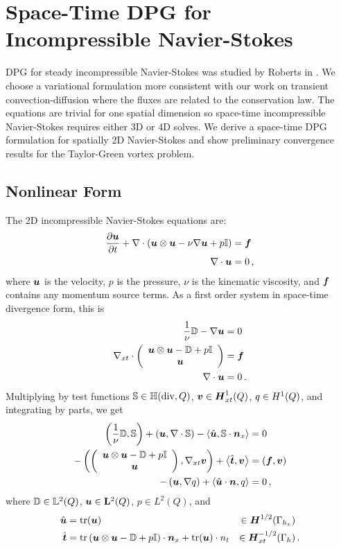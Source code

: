 \documentclass[Dissertation.tex]{subbIles}
\begin{document}
\graphicspath{{../Figures/}}
\chapter{Space-Time DPG for Incompressible Navier-Stokes}
\label{sec:incompressible}

DPG for steady incompressible Navier-Stokes was studied by Roberts in \cite{NateDissertation}. 
We choose a variational formulation more consistent with our work on transient convection-diffusion
where the fluxes are related to the conservation law.
The equations are trivial for one spatial dimension so space-time incompressible
Navier-Stokes requires either 3D or 4D solves.
We derive a space-time DPG formulation for spatially 2D Navier-Stokes and show preliminary 
convergence results for the Taylor-Green vortex problem.

\section{Nonlinear Form}
The 2D incompressible Navier-Stokes equations are:
\begin{align*}
  \frac{\partial\boldsymbol u}{\partial t}+\nabla\cdot\left( \boldsymbol u\otimes\boldsymbol u-\nu\nabla\boldsymbol u+p\mathbb{I} \right)&=\boldsymbol f\\
  \nabla\cdot\boldsymbol u&=0\,,
\end{align*}
where $\boldsymbol u$ is the velocity, $p$ is the pressure, $\nu$ is the kinematic viscosity,
and $\boldsymbol f$ contains any momentum source terms.
As a first order system in space-time divergence form, this is
\begin{align*}
  \frac{1}{\nu}\mathbb{D}-\nabla\boldsymbol u&=0\\
  \nabla_{xt}\cdot\left( \begin{array}{c} \boldsymbol u\otimes\boldsymbol u-\mathbb{D}+p\mathbb{I}\\ \boldsymbol u\\ \end{array} \right)&=\boldsymbol f\\
  \nabla\cdot\boldsymbol u&=0\,.
\end{align*}
Multiplying by test functions $\mathbb{S}\in\mathbb{H}(\text{div},Q)$, $\boldsymbol v\in\mbox{\boldmath $H$}^1_{xt}(Q)$, $q\in H^{1}(Q)$, 
and integrating by parts, we get
\begin{align*}
  \left( \frac{1}{\nu}\mathbb{D},\mathbb{S} \right)
  +\left( \boldsymbol u,\nabla\cdot\mathbb{S} \right)
  -\left\langle \hat{\boldsymbol u},\mathbb{S}\cdot\boldsymbol n_x \right\rangle&=0\\
  -\left( \left( \begin{array}{c} \boldsymbol u\otimes\boldsymbol u-\mathbb{D}+p\mathbb{I}\\ \boldsymbol u\\ \end{array} \right),\nabla_{xt}\boldsymbol v \right)
  +\left\langle \hat{\boldsymbol t},\boldsymbol v \right\rangle
  &=(\boldsymbol f,\boldsymbol v)\\
  -\left( \boldsymbol u,\nabla q \right)
  +\left\langle \hat{\boldsymbol u}\cdot\boldsymbol n,q \right\rangle&=0\,,
\end{align*}
where $\mathbb{D}\in\mathbb{L}^2(Q)$, $\boldsymbol u\in\mathbf{L}^2(Q)$, $p\in L^2(Q)$, and
\begin{align*}
\hat{\boldsymbol u}&=\operatorname*{tr}(\boldsymbol u)&\in \mbox{\boldmath $H$}^{1/2}(\Gamma_{h_x})&\\
\hat{\boldsymbol t}&=\operatorname*{tr}\left( \boldsymbol u\otimes\boldsymbol u-\mathbb{D}+p\mathbb{I} \right)\cdot\boldsymbol n_x
+\operatorname*{tr}(\boldsymbol u)\cdot n_t&\in \mbox{\boldmath $H$}^{-1/2}_{xt}(\Gamma_h)&\,.
\end{align*}
\end{document}
